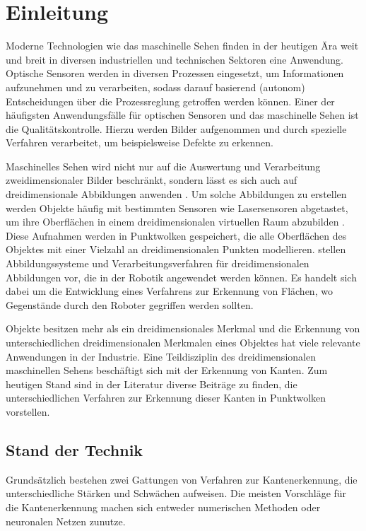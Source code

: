 \chapter{Einleitung}
Moderne Technologien wie das maschinelle Sehen finden in der heutigen Ära weit und breit in diversen industriellen und technischen Sektoren eine Anwendung. Optische Sensoren werden in diversen Prozessen eingesetzt, um Informationen aufzunehmen und zu verarbeiten, sodass darauf basierend (autonom) Entscheidungen über die Prozessreglung getroffen werden können. Einer der häufigsten Anwendungsfälle für optischen Sensoren und das maschinelle Sehen ist die Qualitätskontrolle. Hierzu werden Bilder aufgenommen und durch spezielle Verfahren verarbeitet, um beispielsweise Defekte zu erkennen. \autocite[3-11]{beyerer_machine_2015}

Maschinelles Sehen wird nicht nur auf die Auswertung und Verarbeitung zweidimensionaler Bilder beschränkt, sondern lässt es sich auch auf dreidimensionale Abbildungen anwenden \autocite{biegelbauer_model-based_2010}. Um solche Abbildungen zu erstellen werden Objekte häufig mit bestimmten Sensoren wie Lasersensoren abgetastet, um ihre Oberflächen in einem dreidimensionalen virtuellen Raum abzubilden \autocite[20-22]{savla_intelligente_2022}. Diese Aufnahmen werden in Punktwolken gespeichert, die alle Oberflächen des Objektes mit einer Vielzahl an dreidimensionalen Punkten modellieren. \Textcite{lougheed_3-d_1988} stellen Abbildungssysteme und Verarbeitungsverfahren für dreidimensionalen Abbildungen vor, die in der Robotik angewendet werden können. Es handelt sich dabei um die Entwicklung eines Verfahrens zur Erkennung von Flächen, wo Gegenstände durch den Roboter gegriffen werden sollten. 

Objekte besitzen mehr als ein dreidimensionales Merkmal und die Erkennung von unterschiedlichen dreidimensionalen Merkmalen eines Objektes hat viele relevante Anwendungen in der Industrie. Eine Teildisziplin des dreidimensionalen maschinellen Sehens beschäftigt sich mit der Erkennung von Kanten. Zum heutigen Stand sind in der Literatur diverse Beiträge zu finden, die unterschiedlichen Verfahren zur Erkennung dieser Kanten in Punktwolken vorstellen.

\section{Stand der Technik} \label{Stand_der_Technik}
Grundsätzlich bestehen zwei Gattungen von Verfahren zur Kantenerkennung, die unterschiedliche Stärken und Schwächen aufweisen. Die meisten Vorschläge für die Kantenerkennung machen sich entweder numerischen Methoden oder neuronalen Netzen zunutze.

